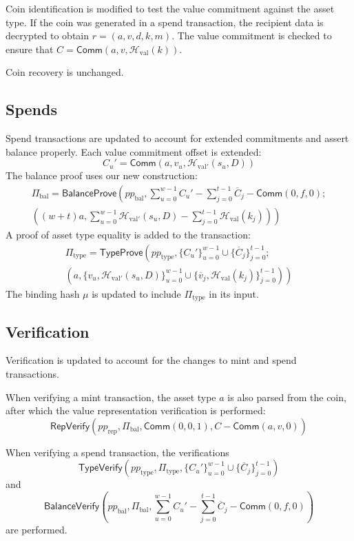 \documentclass{article}
\newcommand{\func}[1]{\mathsf{#1}}
\newcommand{\comm}{\func{Comm}}
\newcommand{\hash}{\mathcal{H}}
\begin{document}
Coin identification is modified to test the value commitment against the asset type.
If the coin was generated in a spend transaction, the recipient data is decrypted to obtain $r = (a, v, d, k, m)$.
The value commitment is checked to ensure that $C = \comm(a, v, \hash_{\text{val}}(k))$.

Coin recovery is unchanged.


\subsection{Spends}

Spend transactions are updated to account for extended commitments and assert balance properly.
Each value commitment offset is extended:
$$C_u' = \comm(a, v_u, \hash_{\text{val}'}(s_u, D))$$
The balance proof uses our new construction:
\begin{multline*}
    \Pi_{\text{bal}} = \func{BalanceProve}\left( pp_{\text{bal}}, \sum_{u=0}^{w-1} C_u' - \sum_{j=0}^{t-1} \overline{C}_j - \comm(0,f,0); \right. \\
    \left. \left( (w + t)a, \sum_{u=0}^{w-1} \hash_{\text{val}'}(s_u,D) - \sum_{j=0}^{t-1} \hash_{\text{val}}(k_j) \right) \right)
\end{multline*}
A proof of asset type equality is added to the transaction:
\begin{multline*}
    \Pi_{\text{type}} = \func{TypeProve}\left( pp_{\text{type}}, \{C_u'\}_{u=0}^{w-1} \cup \{\overline{C}_j\}_{j=0}^{t-1} ; \right. \\
    \left. \left( a, \{ v_u, \hash_{\text{val}'}(s_u,D) \}_{u=0}^{w-1} \cup \{ \overline{v}_j, \hash_{\text{val}}(k_j) \}_{j=0}^{t-1} \right) \right)
\end{multline*}
The binding hash $\mu$ is updated to include $\Pi_{\text{type}}$ in its input.


\subsection{Verification}

Verification is updated to account for the changes to mint and spend transactions.

When verifying a mint transaction, the asset type $a$ is also parsed from the coin, after which the value representation verification is performed:
$$\func{RepVerify}(pp_{\text{rep}}, \Pi_{\text{bal}}, \comm(0,0,1), C - \comm(a,v,0))$$

When verifying a spend transaction, the verifications
$$\func{TypeVerify}(pp_{\text{type}}, \Pi_{\text{type}}, \{C_u'\}_{u=0}^{w-1} \cup \{\overline{C}_j\}_{j=0}^{t-1})$$
and
$$\func{BalanceVerify}\left( pp_{\text{bal}}, \Pi_{\text{bal}}, \sum_{u=0}^{w-1} C_u' - \sum_{j=0}^{t-1} \overline{C}_j - \comm(0,f,0) \right)$$
are performed.
\end{document}
